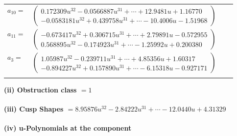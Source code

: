 \documentclass[1p]{elsarticle_modified}
\theoremstyle{definition}
\begin{document}
\begin{tabular}{m{7pt} m{180pt} m{7pt} m{180pt} }
\flushright $a_{10}=$&$\begin{pmatrix}0.172309 u^{32}-0.0566887 u^{31}+\cdots+12.9481 u+1.16770\\-0.0583181 u^{32}+0.439758 u^{31}+\cdots-10.4006 u-1.51968\end{pmatrix}$ \\
\flushright $a_{11}=$&$\begin{pmatrix}-0.673417 u^{32}+0.306715 u^{31}+\cdots+2.79891 u-0.572955\\0.568895 u^{32}-0.174923 u^{31}+\cdots-1.25992 u+0.200380\end{pmatrix}$ \\
\flushright $a_{3}=$&$\begin{pmatrix}1.05987 u^{32}-0.239711 u^{31}+\cdots+4.85356 u+1.60317\\-0.894227 u^{32}+0.157890 u^{31}+\cdots-6.15318 u-0.927171\end{pmatrix}$\\&\end{tabular}
\flushleft \textbf{(ii) Obstruction class $= 1$}\\~\\
\flushleft \textbf{(iii) Cusp Shapes $= 8.95876 u^{32}-2.84222 u^{31}+\cdots-12.0440 u+4.31329$}\\~\\
\newpage\renewcommand{\arraystretch}{1}
\flushleft \textbf{(iv) u-Polynomials at the component}\newline \\
\end{document}

